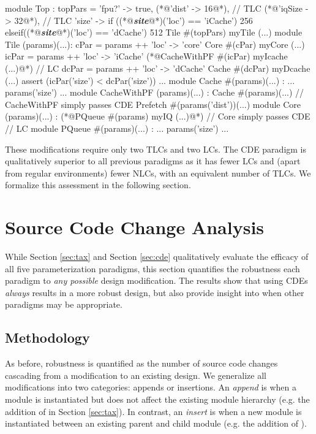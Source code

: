 \begin{phdl}
module Top :
  topPars = {'fpu?' -> true,
             (*@\textcolor[rgb]{1,0,0}{'dist' -> 16}@*),                                   // TLC
             (*@\textcolor[rgb]{1,0,0}{'iqSize -> 32}@*),                                  // TLC
             'size' -> if    ((*@\textcolor[rgb]{1,0.5,0}{\textbf{\textit{site}}}@*)('loc') == 'iCache') 256 
                       elseif((*@\textcolor[rgb]{1,0.5,0}{\textbf{\textit{site}}}@*)('loc') == 'dCache') 512}           
  Tile #(topPars) myTile (...)
module Tile (params)(...):
  cPar = params ++ {'loc' -> 'core'}
  Core #(cPar) myCore (...)
  icPar = params ++ {'loc' -> 'iCache'}
  (*@\textcolor[rgb]{1,0,0}{CacheWithPF \#(icPar) myIcache (...)}@*)                            // LC
  dcPar = params ++ {'loc' -> 'dCache'}
  Cache #(dcPar) myDcache (...)
  assert (icPar('size') < dcPar('size')) ...
module Cache #(params)(...) : ... params('size') ...
module CacheWithPF (params)(...) :
  Cache #(params)(...)        // CacheWithPF simply passes CDE
  Prefetch #(params('dist'))(...)
module Core (params)(...) :
  (*@\textcolor[rgb]{1,0,0}{PQueue \#(params) myIQ (...)}@*) // Core simply passes CDE          // LC
module PQueue #(params)(...) : ... params('size') ...
\end{phdl} 

These modifications require only two TLCs and two LCs. The CDE paradigm is qualitatively superior to all previous paradigms as it has fewer LCs and (apart from regular environments) fewer NLCs, with an equivalent number of TLCs. We formalize this assessment in the following section.

\section{Source Code Change Analysis}
\label{sec:scca}

While Section \ref{sec:tax} and Section \ref{sec:cde} qualitatively evaluate the efficacy of all five parameterization paradigms, this section quantifies the robustness each paradigm to \textit{any possible} design modification. The results show that using CDEs \textit{always} results in a more robust design, but also provide insight into when other paradigms may be appropriate.

\subsection{Methodology}

As before, robustness is quantified as the number of source code changes cascading from a modification to an existing design. 
We generalize all modifications into two categories: appends or insertions. An \emph{append} is when a module is instantiated but does not affect the existing module hierarchy (e.g. the addition of  in Section \ref{sec:tax}). In contrast, an \emph{insert} is when a new module is instantiated between an existing parent and child module (e.g. the addition of ). 

